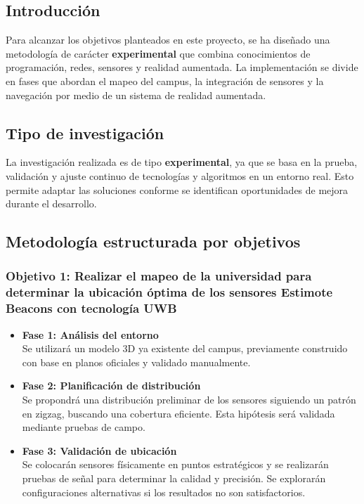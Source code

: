 \documentclass{article}
\begin{document}
\subsection{Introducción}

Para alcanzar los objetivos planteados en este proyecto, se ha diseñado una metodología de carácter \textbf{experimental} que combina conocimientos de programación, redes, sensores y realidad aumentada. La implementación se divide en fases que abordan el mapeo del campus, la integración de sensores y la navegación por medio de un sistema de realidad aumentada.

\subsection{Tipo de investigación}

La investigación realizada es de tipo \textbf{experimental}, ya que se basa en la prueba, validación y ajuste continuo de tecnologías y algoritmos en un entorno real. Esto permite adaptar las soluciones conforme se identifican oportunidades de mejora durante el desarrollo.

\subsection{Metodología estructurada por objetivos}

\subsubsection{Objetivo 1: Realizar el mapeo de la universidad para determinar la ubicación óptima de los sensores Estimote Beacons con tecnología UWB}

\begin{itemize}
    \item \textbf{Fase 1: Análisis del entorno} \\
    Se utilizará un modelo 3D ya existente del campus, previamente construido con base en planos oficiales y validado manualmente.

    \item \textbf{Fase 2: Planificación de distribución} \\
    Se propondrá una distribución preliminar de los sensores siguiendo un patrón en zigzag, buscando una cobertura eficiente. Esta hipótesis será validada mediante pruebas de campo.

    \item \textbf{Fase 3: Validación de ubicación} \\
    Se colocarán sensores físicamente en puntos estratégicos y se realizarán pruebas de señal para determinar la calidad y precisión. Se explorarán configuraciones alternativas si los resultados no son satisfactorios.
\end{itemize}
\end{document}
